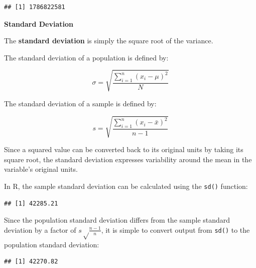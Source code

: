 \documentclass[
]{book}
\newenvironment{Shaded}{\begin{snugshade}}{\end{snugshade}}
\newcommand{\CommentTok}[1]{\textcolor[rgb]{0.56,0.35,0.01}{\textit{#1}}}
\newcommand{\DecValTok}[1]{\textcolor[rgb]{0.00,0.00,0.81}{#1}}
\newcommand{\FunctionTok}[1]{\textcolor[rgb]{0.00,0.00,0.00}{#1}}
\newcommand{\NormalTok}[1]{#1}
\newcommand{\SpecialCharTok}[1]{\textcolor[rgb]{0.00,0.00,0.00}{#1}}
\begin{document}
\begin{verbatim}
## [1] 1786822581
\end{verbatim}

\textbf{Standard Deviation}

The \textbf{standard deviation} is simply the square root of the variance.

The standard deviation of a population is defined by:

\[ \sigma = \sqrt{\frac{\displaystyle\sum_{i=1}^{n} (x_{i} - \mu)^{2}}{N}} \]

The standard deviation of a sample is defined by:

\[ s = \sqrt{\frac{\displaystyle\sum_{i=1}^{n} (x_{i} - \bar{x})^{2}}{n - 1}} \]

Since a squared value can be converted back to its original units by taking its square root, the standard deviation expresses variability around the mean in the variable's original units.

In R, the sample standard deviation can be calculated using the \texttt{sd()} function:

\begin{Shaded}
\end{Shaded}

\begin{verbatim}
## [1] 42285.21
\end{verbatim}

Since the population standard deviation differs from the sample standard deviation by a factor of \(s \sqrt \frac{n - 1}{n}\), it is simple to convert output from \texttt{sd()} to the population standard deviation:

\begin{Shaded}
\end{Shaded}

\begin{verbatim}
## [1] 42270.82
\end{verbatim}
\end{document}
